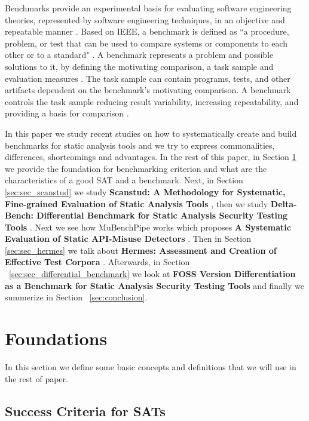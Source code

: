 \documentclass[authoryear,preprint]{sigplanconf}
\begin{document}
Benchmarks provide an experimental basis for evaluating software engineering theories, represented by software engineering techniques, in an objective and repeatable manner \cite{675631}. Based on IEEE, a benchmark is defined as ``a procedure, problem, or test that can be used to compare systems or components to each other or to a standard" \cite{IEEE1990}. A benchmark represents a problem and possible solutions to it, by defining the motivating comparison, a task sample and evaluation measures \cite{sim2003}.  The task sample can contain programs, tests, and other artifacts dependent on the benchmark’s motivating comparison. A benchmark controls the task sample reducing result variability, increasing repeatability, and providing a basis for comparison \cite{sim2003}.

In this paper we study recent studies on how to systematically create and build benchmarks for static analysis tools and we try to express commonalities, differences, shortcomings and advantages. In the rest of this paper, in Section \ref{sec:sec_approaches} we provide the foundation for benchmarking criterion and what are the characteristics of a good SAT and a benchmark. Next, in Section \ref{sec:sec_scanstud} we study \textbf{Scanstud: A Methodology for Systematic, Fine-grained Evaluation of Static Analysis Tools} \cite{Scanstud}, then we study \textbf{Delta-Bench: Differential Benchmark for Static Analysis Security Testing Tools} \cite{8170097}. Next we see how MuBenchPipe works which proposes \textbf{A Systematic Evaluation of Static API-Misuse Detectors} \cite{8338426}. Then in Section \ref{sec:sec_hermes} we talk about \textbf{Hermes: Assessment and Creation of Effective Test Corpora} \cite{Reif:2017:HAC:3088515.3088523}. Afterwards, in Section ~\ref{sec:sec_differential_benchmark} we look at \textbf{FOSS Version Differentiation as a Benchmark for Static Analysis Security Testing Tools} \cite{Pashchenko:2017:FVD:3106237.3121276} and finally we summerize in Section ~\ref{sec:conclusion}. 

\section{Foundations}
\label{sec:sec_approaches}

In this section we define some basic concepts and definitions that we will use in the rest of paper. 

\subsection{Success Criteria for SATs}
\label{sec:subsec_successc}
\end{document}
